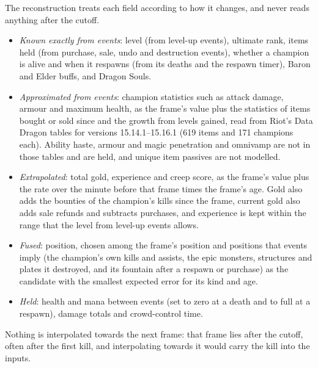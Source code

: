 The reconstruction treats each field according to how it changes, and never reads anything after the
cutoff.
\begin{itemize}
\item \emph{Known exactly from events}: level (from level-up events), ultimate rank, items held (from
  purchase, sale, undo and destruction events), whether a champion is alive and when it respawns (from its
  deaths and the respawn timer), Baron and Elder buffs, and Dragon Souls.
\item \emph{Approximated from events}: champion statistics such as attack damage, armour and maximum
  health, as the frame's value plus the statistics of items bought or sold since and the growth from
  levels gained, read from Riot's Data Dragon tables for versions 15.14.1--15.16.1 (619 items and 171
  champions each). Ability haste, armour and magic penetration and omnivamp are not in those tables and
  are held, and unique item passives are not modelled.
\item \emph{Extrapolated}: total gold, experience and creep score, as the frame's value plus the rate over
  the minute before that frame times the frame's age. Gold also adds the bounties of the champion's kills
  since the frame, current gold also adds sale refunds and subtracts purchases, and experience is kept
  within the range that the level from level-up events allows.
\item \emph{Fused}: position, chosen among the frame's position and positions that events imply (the
  champion's own kills and assists, the epic monsters, structures and plates it destroyed, and its
  fountain after a respawn or purchase) as the candidate with the smallest expected error for its kind
  and age.
\item \emph{Held}: health and mana between events (set to zero at a death and to full at a respawn),
  damage totals and crowd-control time.
\end{itemize}
Nothing is interpolated towards the next frame: that frame lies after the cutoff, often after the first
kill, and interpolating towards it would carry the kill into the inputs.
